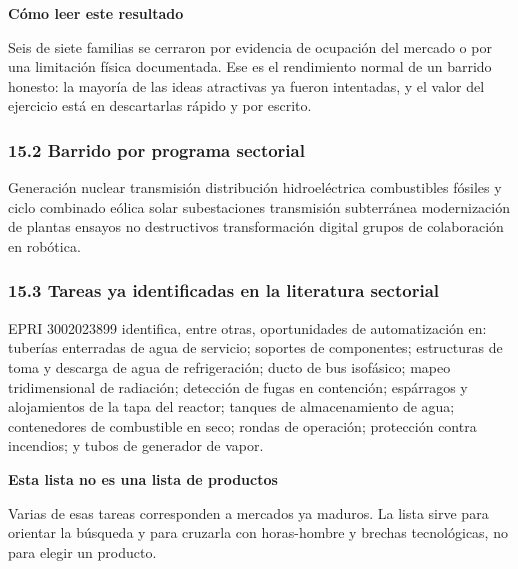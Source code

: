 \documentclass[11pt,a4paper]{article}
\newenvironment{notariesgo}[1]
  {\begin{notariesgobase}{\sffamily\scriptsize\bfseries\color{red}#1}\par\vspace{2pt}}
  {\end{notariesgobase}}
\newenvironment{notainferencia}[1]
  {\begin{notainferenciabase}{\sffamily\scriptsize\bfseries\color{green}#1}\par\vspace{2pt}}
  {\end{notainferenciabase}}
\begin{document}
\begin{notainferencia}{Cómo leer este resultado}
Seis de siete familias se cerraron por evidencia de ocupación del mercado o por una limitación física documentada. Ese es el rendimiento normal de un barrido honesto: la mayoría de las ideas atractivas ya fueron intentadas, y el valor del ejercicio está en descartarlas rápido y por escrito.

\end{notainferencia}

\subsubsection*{15.2 Barrido por programa sectorial}

Generación \textperiodcentered{} nuclear \textperiodcentered{} transmisión \textperiodcentered{} distribución \textperiodcentered{} hidroeléctrica \textperiodcentered{} combustibles fósiles y ciclo combinado \textperiodcentered{} eólica \textperiodcentered{} solar \textperiodcentered{} subestaciones \textperiodcentered{} transmisión subterránea \textperiodcentered{} modernización de plantas \textperiodcentered{} ensayos no destructivos \textperiodcentered{} transformación digital \textperiodcentered{} grupos de colaboración en robótica.


\subsubsection*{15.3 Tareas ya identificadas en la literatura sectorial}

EPRI 3002023899 identifica, entre otras, oportunidades de automatización en: tuberías enterradas de agua de servicio; soportes de componentes; estructuras de toma y descarga de agua de refrigeración; ducto de bus isofásico; mapeo tridimensional de radiación; detección de fugas en contención; espárragos y alojamientos de la tapa del reactor; tanques de almacenamiento de agua; contenedores de combustible en seco; rondas de operación; protección contra incendios; y tubos de generador de vapor.

\begin{notariesgo}{Esta lista no es una lista de productos}
Varias de esas tareas corresponden a mercados ya maduros. La lista sirve para orientar la búsqueda y para cruzarla con horas-hombre y brechas tecnológicas, no para elegir un producto.

\end{notariesgo}
\end{document}
